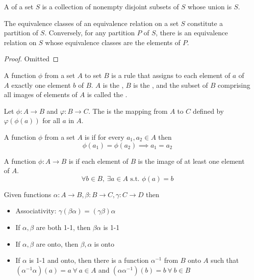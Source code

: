 \documentclass[12pt]{scrartcl}
\begin{document}
\begin{definition}
  A  of a set $S$ is a collection of nonempty disjoint subsets of $S$ whose union is $S$. 
\end{definition}

\begin{theorem}
  The equivalence classes of an equivalence relation on a set $S$ constitute a partition of $S$. 
  Conversely, for any partition $P$ of $S$, there is an equivalence relation on $S$ whose 
  equivalence classes are the elements of $P$. 
  \begin{proof}
    Omitted
  \end{proof}
\end{theorem}

\begin{definition}
  A function $\phi$ from a set $A$ to set $B$ is a rule that assigns to each element of $a$ of $A$ 
  exactly one element $b$ of $B$. $A$ is the , $B$ is the , and 
  the subset of $B$ comprising all images of elements of $A$ is called the . 
\end{definition}

\begin{definition}
    Let $\phi: A \to B$ and $\varphi: B \to C$. The  is the mapping from 
    $A$ to $C$ defined by $\varphi(\phi(a))$ for all $a$ in $A$. 
\end{definition}

\begin{definition}
  A function $\phi$ from a set $A$ is  if for every $a_1, a_2 \in A$ then 
  \[\phi(a_1) = \phi(a_2) \implies a_1 = a_2\]
\end{definition}

\begin{definition}
  A function $\phi: A \to B$ is  if each element of $B$ is the image of at least one element of $A$. 
  \[\forall b \in B, \ \exists a \in A \text{ s.t. } \phi(a) = b\]
\end{definition}

\begin{theorem}
  Given functions $\alpha: A \to B, \beta: B \to C, \gamma: C \to D$ then 
  \begin{itemize}
    \item Associativity: $\gamma(\beta \alpha) = (\gamma \beta)\alpha$
    \item If $\alpha, \beta$ are both 1-1, then $\beta\alpha$ is 1-1
    \item If $\alpha, \beta$ are onto, then $\beta, \alpha$ is onto
    \item If $\alpha$ is 1-1 and onto, then there is a function $\alpha^{-1}$ from $B$ onto $A$ 
    such that $(\alpha^{-1}\alpha)(a) = a \ \forall \ a \in A$ and $(\alpha\alpha^{-1})(b) = b \ \forall \ b \in B$
  \end{itemize}
\end{theorem}
\end{document}
